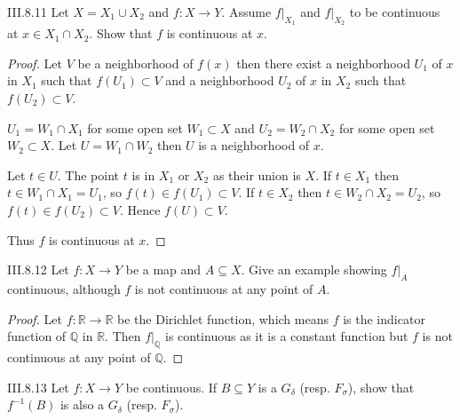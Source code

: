 \begin{problem}{III.8.11}
Let \( X = X_{1} \cup X_{2} \) and \( f: X \to Y \). Assume \( f\vert_{X_{1}} \) and \( f\vert_{X_{2}} \) to be continuous at \( x \in X_{1} \cap X_{2} \). Show that \( f \) is continuous at \( x \).
\end{problem}

\begin{proof}
	Let \( V \) be a neighborhood of \( f(x) \) then there exist a neighborhood \( U_{1} \) of \( x \) in \( X_{1} \) such that \( f(U_{1}) \subset V \) and a neighborhood \( U_{2} \) of \( x \) in \( X_{2} \) such that \( f(U_{2}) \subset V \).

	\( U_{1} = W_{1} \cap X_{1} \) for some open set \( W_{1} \subset X \) and \( U_{2} = W_{2} \cap X_{2} \) for some open set \( W_{2} \subset X \). Let \( U = W_{1} \cap W_{2} \) then \( U \) is a neighborhood of \( x \).

	Let \( t \in U \). The point \( t \) is in \( X_{1} \) or \( X_{2} \) as their union is \( X \). If \( t \in X_{1} \) then \( t \in W_{1} \cap X_{1} = U_{1} \), so \( f(t) \in f(U_{1}) \subset V \). If \( t \in X_{2} \) then \( t \in W_{2} \cap X_{2} = U_{2} \), so \( f(t) \in f(U_{2}) \subset V \). Hence \( f(U) \subset V \).

	Thus \( f \) is continuous at \( x \).
\end{proof}

\begin{problem}{III.8.12}
Let \( f: X \to Y \) be a map and \( A \subseteq X \). Give an example showing \( f\vert_{A} \) continuous, although \( f \) is not continuous at any point of \( A \).
\end{problem}

\begin{proof}
	Let \( f: \mathbb{R} \to \mathbb{R} \) be the Dirichlet function, which means \( f \) is the indicator function of \( \mathbb{Q} \) in \( \mathbb{R} \). Then \( f\vert_{\mathbb{Q}} \) is continuous as it is a constant function but \( f \) is not continuous at any point of \( \mathbb{Q} \).
\end{proof}

\begin{problem}{III.8.13}
Let \( f: X \to Y \) be continuous. If \( B \subseteq Y \) is a \( G_{\delta} \) (resp. \( F_{\sigma} \)), show that \( f^{-1}(B) \) is also a \( G_{\delta} \) (resp. \( F_{\sigma} \)).
\end{problem}

